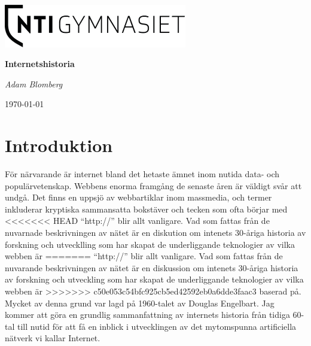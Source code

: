 \documentclass[a4paper,11pt]{article}
\begin{document}
\begin{titlepage}
	\centering
	\includegraphics[width=0.6\textwidth]{Bilder/logo.png}\par\vspace{1cm}
	\vspace{1.5cm}
	{\huge\bfseries Internetshistoria\par}
	\vspace{2cm}
	{\Large\itshape Adam Blomberg\par}
	\vfill
{}
	\vfill

	{\large \today\par}
\end{titlepage}

\tableofcontents
\newpage

\section{Introduktion}
För närvarande är internet bland det hetaste ämnet inom nutida data-
och populärvetenskap. Webbens enorma framgång de senaste åren är väldigt svår
att undgå. Det finns en uppsjö av webbartiklar inom massmedia, och termer
inkluderar kryptiska sammansatta bokstäver och tecken som ofta börjar med
<<<<<<< HEAD
``http://'' blir allt vanligare. Vad som fattas från de nuvarnade beskrivningen
av nätet är en diskution om intenets 30-åriga historia av forskning och
utvecklling som har skapat de underliggande teknologier av vilka webben är
=======
``http://'' blir allt vanligare. Vad som fattas från de nuvarande beskrivningen
av nätet är en diskussion om intenets 30-åriga historia av forskning och
utveckling som har skapat de underliggande teknologier av vilka webben är
>>>>>>> c50e053c54bfc925cb5ed42592eb0a6dde3faac3
baserad på. Mycket av denna grund var lagd på 1960-talet av Douglas Engelbart.
Jag kommer att göra en grundlig sammanfattning av internets historia från tidiga
60-tal till nutid för att få en inblick i utvecklingen av det mytomspunna
artificiella nätverk vi kallar Internet.
\end{document}
